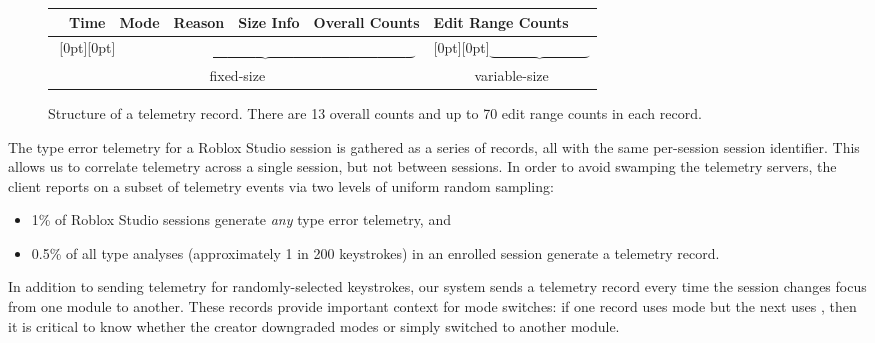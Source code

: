 \documentclass[english,submission,cleveref]{programming}
\begin{document}
\begin{figure}[t]\centering
  \begin{tabular}{|l|l|l|l|l|l|l|}\hline
    \uid{} & Time & Mode & Reason & Size Info & Overall Counts & Edit Range Counts
    \\\toprule
    \multicolumn{6}{c}{\raisebox{.5\normalbaselineskip}[0pt][0pt]{$\underbrace{\hspace{9cm}}$}} &
    \multicolumn{1}{c}{\raisebox{.5\normalbaselineskip}[0pt][0pt]{$\underbrace{\hspace{3cm}}$}} \\[-0.5ex]
    \multicolumn{6}{c}{fixed-size} & \multicolumn{1}{c}{variable-size}
  \end{tabular}
  \caption{Structure of a telemetry record. There are 13 overall counts and up to 70 edit range counts in each record.}
  \label{f:tdata}
\end{figure}

The type error telemetry for a Roblox Studio session is gathered as a series of
records, all with the same per-session \panon{} session identifier.
This allows us to correlate telemetry across a single
session, but not between sessions.
In order to avoid swamping the telemetry servers, the client reports on a subset
of telemetry events via two levels of uniform random sampling:
\begin{itemize}
  \item
    1\% of Roblox Studio sessions generate \emph{any} type error telemetry, and
  \item
    0.5\% of all type analyses (approximately 1 in 200 keystrokes)
    in an enrolled session generate a telemetry record.
\end{itemize}
In addition to sending telemetry for randomly-selected keystrokes,
our system sends a telemetry record every time the session changes
focus from one module to another.
These records provide important context for mode switches:
if one record uses \mstrict{} mode but the next uses \mnocheck{},
then it is critical to know whether the creator downgraded modes
or simply switched to another module.
\end{document}
